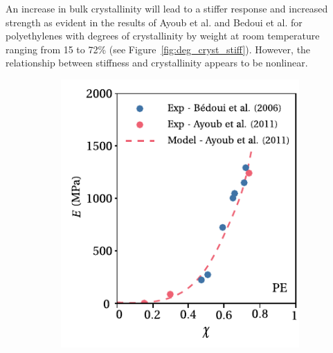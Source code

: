 An increase in bulk crystallinity will lead to a stiffer response and increased strength as evident in the results of Ayoub et al. \citep{ayoubEffectsCrystalContent2011} and Bedoui et al. \citep{bedouiMicromechanicalModelingIsotropic2006} for polyethylenes with degrees of crystallinity by weight at room temperature ranging from 15 to 72\% (see Figure~\ref{fig:deg_cryst_stiff}).
However, the relationship between stiffness and crystallinity appears to be nonlinear.
\begin{figure}[hbtp]
    \centering
    \begin{subfigure}[b]{0.45\textwidth}
                            \centering
                            \includegraphics[width=\textwidth]{figures/deg_cryst_stiff}
                            \caption{}
                            \label{subfig:deg_cryst_stiff}
            \end{subfigure} \hfill
            \begin{subfigure}[b]{0.45\textwidth}
                            \centering

\end{subfigure}
\end{figure}
